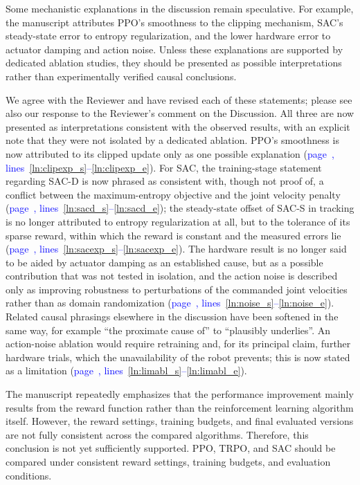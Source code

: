 \documentclass[11pt]{elsarticle}
\newcommand{\mlines}[2]{\textcolor{blue}{page~\pageref{#1}, lines~\ref{#1}--\ref{#2}}}
\begin{document}
\begin{reviewerbox}[Comment R1.9]
Some mechanistic explanations in the discussion remain speculative. For example, the manuscript attributes PPO's smoothness to the clipping mechanism, SAC's steady-state error to entropy regularization, and the lower hardware error to actuator damping and action noise. Unless these explanations are supported by dedicated ablation studies, they should be presented as possible interpretations rather than experimentally verified causal conclusions.
\end{reviewerbox}

\begin{responsebox}
We agree with the Reviewer and have revised each of these statements; please see also our response to the Reviewer's comment on the Discussion. All three are now presented as interpretations consistent with the observed results, with an explicit note that they were not isolated by a dedicated ablation. PPO's smoothness is now attributed to its clipped update only as one possible explanation (\mlines{ln:clipexp_s}{ln:clipexp_e}). For SAC, the training-stage statement regarding SAC-D is now phrased as consistent with, though not proof of, a conflict between the maximum-entropy objective and the joint velocity penalty (\mlines{ln:sacd_s}{ln:sacd_e}); the steady-state offset of SAC-S in tracking is no longer attributed to entropy regularization at all, but to the tolerance of its sparse reward, within which the reward is constant and the measured errors lie (\mlines{ln:sacexp_s}{ln:sacexp_e}). The hardware result is no longer said to be aided by actuator damping as an established cause, but as a possible contribution that was not tested in isolation, and the action noise is described only as improving robustness to perturbations of the commanded joint velocities rather than as domain randomization (\mlines{ln:noise_s}{ln:noise_e}). Related causal phrasings elsewhere in the discussion have been softened in the same way, for example ``the proximate cause of'' to ``plausibly underlies''. An action-noise ablation would require retraining and, for its principal claim, further hardware trials, which the unavailability of the robot prevents; this is now stated as a limitation (\mlines{ln:limabl_s}{ln:limabl_e}).
\end{responsebox}

\begin{reviewerbox}[Comment R1.10]
The manuscript repeatedly emphasizes that the performance improvement mainly results from the reward function rather than the reinforcement learning algorithm itself. However, the reward settings, training budgets, and final evaluated versions are not fully consistent across the compared algorithms. Therefore, this conclusion is not yet sufficiently supported. PPO, TRPO, and SAC should be compared under consistent reward settings, training budgets, and evaluation conditions.
\end{reviewerbox}
\end{document}
